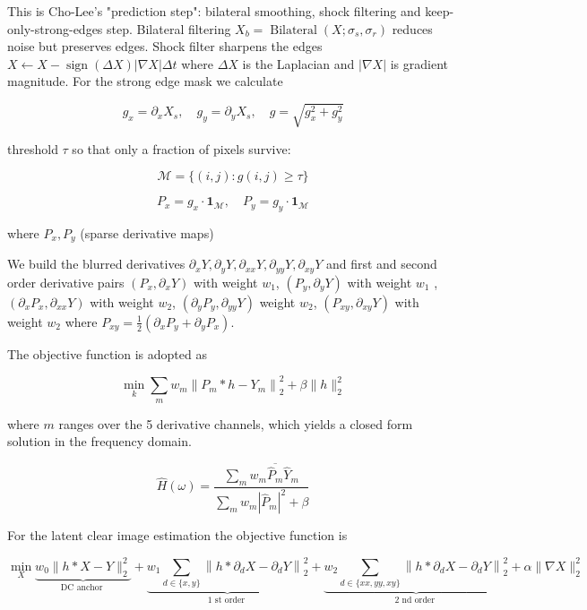 \documentclass{article}
\newcounter{subsubsubsection}[subsubsection]
\theoremstyle{definition}
\begin{document}


This is Cho-Lee's "prediction step": bilateral smoothing, shock filtering and keep-only-strong-edges step. Bilateral filtering $X_b=\operatorname{Bilateral}\left(X ; \sigma_s, \sigma_r\right)$ reduces noise but preserves edges. Shock filter sharpens the edges $X \leftarrow X-\operatorname{sign}(\Delta X)|\nabla X| \Delta t$ where $\Delta X$ is the Laplacian and $|\nabla X|$ is gradient magnitude. For the strong edge mask we calculate 


$$
g_x=\partial_x X_s, \quad g_y=\partial_y X_s, \quad g=\sqrt{g_x^2+g_y^2}
$$

threshold $\tau$ so that only a fraction of pixels survive:

$$
\mathcal{M}=\{(i, j): g(i, j) \geq \tau\}
$$


$$
P_x=g_x \cdot \mathbf{1}_{\mathcal{M}}, \quad P_y=g_y \cdot \mathbf{1}_{\mathcal{M}}
$$

where $P_x, P_y$ (sparse derivative maps)





We build the blurred derivatives $\partial_x Y, \partial_y Y, \partial_{x x} Y, \partial_{y y} Y, \partial_{x y} Y$ and first and second order derivative pairs $\left(P_x, \partial_x Y\right)$ with weight $w_1$,
$\left(P_y, \partial_y Y\right)$ with weight $w_1$
,$\left(\partial_x P_x, \partial_{x x} Y\right)$ with weight $w_2$,
$\left(\partial_y P_y, \partial_{y y} Y\right)$ weight $w_2$,
$\left(P_{x y}, \partial_{x y} Y\right)$ with weight $w_2$ where $P_{x y}=\frac{1}{2}\left(\partial_x P_y+\partial_y P_x\right)$.

The objective function is adopted as 

$$
\min _k \sum_m w_m\left\|P_m * h-Y_m\right\|_2^2+\beta\|h\|_2^2
$$


where $m$ ranges over the 5 derivative channels, which yields a closed form solution in the frequency domain. 


$$
\hat{H}(\omega)=\frac{\sum_m w_m \overline{\hat{P}_m} \hat{Y}_m}{\sum_m w_m\left|\hat{P}_m\right|^2+\beta}
$$



For the latent clear image estimation the objective function is 

$$
\min _X \underbrace{w_0\|h * X-Y\|_2^2}_{\text {DC anchor }}+\underbrace{w_1 \sum_{d \in\{x, y\}}\left\|h * \partial_d X-\partial_d Y\right\|_2^2}_{1 \text { st order }}+\underbrace{w_2 \sum_{d \in\{x x, y y, x y\}}\left\|h * \partial_d X-\partial_d Y\right\|_2^2}_{2 \text { nd order }}+\alpha\|\nabla X\|_2^2
$$
\end{document}
